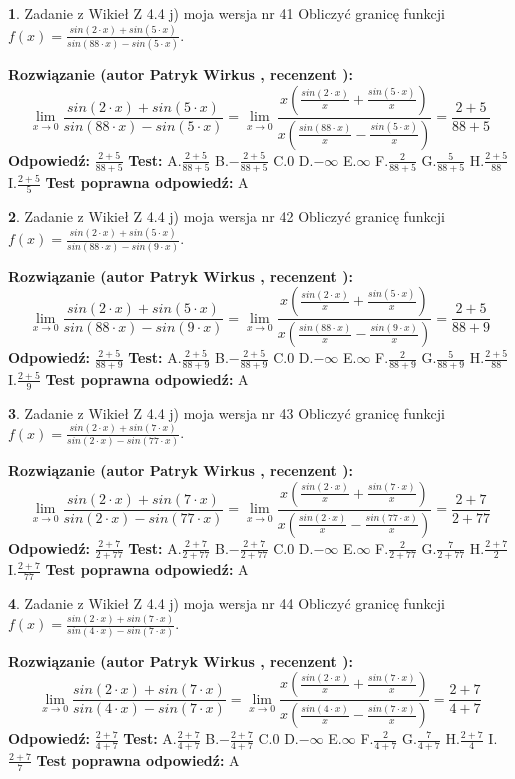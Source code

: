 \documentclass[12pt, a4paper]{article}
\theoremstyle{definition} %
\newtheorem{zad}{}
\newcommand{\zadStart}[1]{\begin{zad}#1\newline}
\newcommand{\zadStop}{\end{zad}}
\newcommand{\rozwStart}[2]{\noindent \textbf{Rozwiązanie (autor #1 , recenzent #2): }\newline}
\newcommand{\rozwStop}{\newline}
\newcommand{\odpStart}{\noindent \textbf{Odpowiedź:}\newline}
\newcommand{\odpStop}{\newline}
\newcommand{\testStart}{\noindent \textbf{Test:}\newline}
\newcommand{\testStop}{\newline}
\newcommand{\kluczStart}{\noindent \textbf{Test poprawna odpowiedź:}\newline}
\newcommand{\kluczStop}{\newline}
\begin{document}
\zadStart{Zadanie z Wikieł Z 4.4 j) moja wersja nr 41}
Obliczyć granicę funkcji $f(x)=\frac{sin(2\cdot x) +sin(5\cdot x)}{sin(88\cdot x) -sin(5\cdot x)}$.
\zadStop
\rozwStart{Patryk Wirkus}{}
$$\lim\limits_{x\to 0}\frac{sin(2\cdot x) +sin(5\cdot x)}{sin(88\cdot x) -sin(5\cdot x)}=\lim\limits_{x\to 0}\frac{x(\frac{sin(2\cdot x)}{x}+\frac{sin(5\cdot x)}{x})}{x(\frac{sin(88\cdot x)}{x}-\frac{sin(5\cdot x)}{x})}=\frac{2+5}{88+5}$$
\rozwStop
\odpStart
$\frac{2+5}{88+5}$
\odpStop
\testStart
A.$\frac{2+5}{88+5}$
B.$-\frac{2+5}{88+5}$
C.$0$
D.$-\infty$
E.$\infty$
F.$\frac{2}{88+5}$
G.$\frac{5}{88+5}$
H.$\frac{2+5}{88}$
I.$\frac{2+5}{5}$
\testStop
\kluczStart
A
\kluczStop



\zadStart{Zadanie z Wikieł Z 4.4 j) moja wersja nr 42}
Obliczyć granicę funkcji $f(x)=\frac{sin(2\cdot x) +sin(5\cdot x)}{sin(88\cdot x) -sin(9\cdot x)}$.
\zadStop
\rozwStart{Patryk Wirkus}{}
$$\lim\limits_{x\to 0}\frac{sin(2\cdot x) +sin(5\cdot x)}{sin(88\cdot x) -sin(9\cdot x)}=\lim\limits_{x\to 0}\frac{x(\frac{sin(2\cdot x)}{x}+\frac{sin(5\cdot x)}{x})}{x(\frac{sin(88\cdot x)}{x}-\frac{sin(9\cdot x)}{x})}=\frac{2+5}{88+9}$$
\rozwStop
\odpStart
$\frac{2+5}{88+9}$
\odpStop
\testStart
A.$\frac{2+5}{88+9}$
B.$-\frac{2+5}{88+9}$
C.$0$
D.$-\infty$
E.$\infty$
F.$\frac{2}{88+9}$
G.$\frac{5}{88+9}$
H.$\frac{2+5}{88}$
I.$\frac{2+5}{9}$
\testStop
\kluczStart
A
\kluczStop



\zadStart{Zadanie z Wikieł Z 4.4 j) moja wersja nr 43}
Obliczyć granicę funkcji $f(x)=\frac{sin(2\cdot x) +sin(7\cdot x)}{sin(2\cdot x) -sin(77\cdot x)}$.
\zadStop
\rozwStart{Patryk Wirkus}{}
$$\lim\limits_{x\to 0}\frac{sin(2\cdot x) +sin(7\cdot x)}{sin(2\cdot x) -sin(77\cdot x)}=\lim\limits_{x\to 0}\frac{x(\frac{sin(2\cdot x)}{x}+\frac{sin(7\cdot x)}{x})}{x(\frac{sin(2\cdot x)}{x}-\frac{sin(77\cdot x)}{x})}=\frac{2+7}{2+77}$$
\rozwStop
\odpStart
$\frac{2+7}{2+77}$
\odpStop
\testStart
A.$\frac{2+7}{2+77}$
B.$-\frac{2+7}{2+77}$
C.$0$
D.$-\infty$
E.$\infty$
F.$\frac{2}{2+77}$
G.$\frac{7}{2+77}$
H.$\frac{2+7}{2}$
I.$\frac{2+7}{77}$
\testStop
\kluczStart
A
\kluczStop



\zadStart{Zadanie z Wikieł Z 4.4 j) moja wersja nr 44}
Obliczyć granicę funkcji $f(x)=\frac{sin(2\cdot x) +sin(7\cdot x)}{sin(4\cdot x) -sin(7\cdot x)}$.
\zadStop
\rozwStart{Patryk Wirkus}{}
$$\lim\limits_{x\to 0}\frac{sin(2\cdot x) +sin(7\cdot x)}{sin(4\cdot x) -sin(7\cdot x)}=\lim\limits_{x\to 0}\frac{x(\frac{sin(2\cdot x)}{x}+\frac{sin(7\cdot x)}{x})}{x(\frac{sin(4\cdot x)}{x}-\frac{sin(7\cdot x)}{x})}=\frac{2+7}{4+7}$$
\rozwStop
\odpStart
$\frac{2+7}{4+7}$
\odpStop
\testStart
A.$\frac{2+7}{4+7}$
B.$-\frac{2+7}{4+7}$
C.$0$
D.$-\infty$
E.$\infty$
F.$\frac{2}{4+7}$
G.$\frac{7}{4+7}$
H.$\frac{2+7}{4}$
I.$\frac{2+7}{7}$
\testStop
\kluczStart
A
\kluczStop
\end{document}
